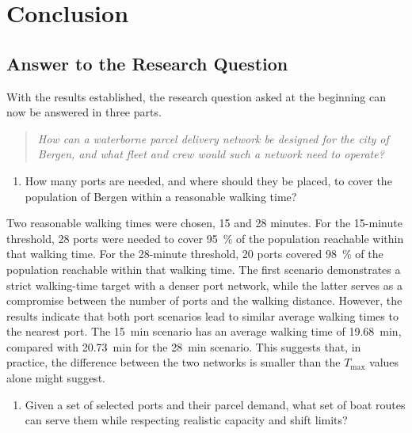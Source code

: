 \documentclass[12pt]{article}
\begin{document}
\section{Conclusion}
\label{sec:conclusion}

\subsection{Answer to the Research Question}
\label{subsec:summary-of-findings}

With the results established, the research question asked at the beginning can now be answered in three parts.

\begin{quote}
  \textit{How can a waterborne parcel delivery network be designed for the city of Bergen, and what fleet and crew would such a network need to operate?}
\end{quote}

\begin{enumerate}
  \item How many ports are needed, and where should they be placed, to cover the population of Bergen within a reasonable walking time?
\end{enumerate}

Two reasonable walking times were chosen, 15 and 28 minutes. For the 15-minute threshold, 28 ports were needed to cover \qty{95}{\percent} of the population reachable within that walking time. For the 28-minute threshold, 20 ports covered \qty{98}{\percent} of the population reachable within that walking time. The first scenario demonstrates a strict walking-time target with a denser port network, while the latter serves as a compromise between the number of ports and the walking distance. However, the results indicate that both port scenarios lead to similar average walking times to the nearest port. The \qty{15}{\minute} scenario has an average walking time of \qty{19.68}{\minute}, compared with \qty{20.73}{\minute} for the \qty{28}{\minute} scenario. This suggests that, in practice, the difference between the two networks is smaller than the \(T_{\max}\) values alone might suggest.

\begin{enumerate}[resume]
  \item Given a set of selected ports and their parcel demand, what set of boat routes can serve them while respecting realistic capacity and shift limits?
\end{enumerate}
\end{document}
